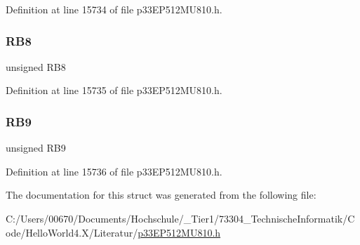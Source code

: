 Definition at line 15734 of file p33\+E\+P512\+M\+U810.\+h.

\mbox{\label{structtag_p_o_r_t_b_b_i_t_s_a2825ec1e15724a33a16ee7b322603c58}} 
\subsubsection{\texorpdfstring{R\+B8}{RB8}}
{\footnotesize\ttfamily unsigned R\+B8}



Definition at line 15735 of file p33\+E\+P512\+M\+U810.\+h.

\mbox{\label{structtag_p_o_r_t_b_b_i_t_s_adcf2107e3a49ae49f996d816a2551b28}} 
\subsubsection{\texorpdfstring{R\+B9}{RB9}}
{\footnotesize\ttfamily unsigned R\+B9}



Definition at line 15736 of file p33\+E\+P512\+M\+U810.\+h.



The documentation for this struct was generated from the following file\+:\begin{DoxyCompactItemize}
\item 
C\+:/\+Users/00670/\+Documents/\+Hochschule/\+\_\+\+Tier1/73304\+\_\+\+Technische\+Informatik/\+Code/\+Hello\+World4.\+X/\+Literatur/\hyperlink{p33_e_p512_m_u810_8h}{p33\+E\+P512\+M\+U810.\+h}\end{DoxyCompactItemize}
